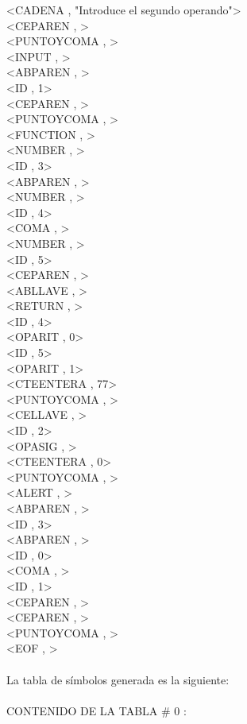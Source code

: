 \documentclass{article}
\begin{document}
\begin{flushleft}
<CADENA , "Introduce el segundo operando">\\
<CEPAREN , >\\
<PUNTOYCOMA , >\\
<INPUT , >\\
<ABPAREN , >\\
<ID , 1>\\
<CEPAREN , >\\
<PUNTOYCOMA , >\\
<FUNCTION , >\\
<NUMBER , >\\
<ID , 3>\\
<ABPAREN , >\\
<NUMBER , >\\
<ID , 4>\\
<COMA , >\\
<NUMBER , >\\
<ID , 5>\\
<CEPAREN , >\\
<ABLLAVE , >\\
<RETURN , >\\
<ID , 4>\\
<OPARIT , 0>\\
<ID , 5>\\
<OPARIT , 1>\\
<CTEENTERA , 77>\\
<PUNTOYCOMA , >\\
<CELLAVE , >\\
<ID , 2>\\
<OPASIG , >\\
<CTEENTERA , 0>\\
<PUNTOYCOMA , >\\
<ALERT , >\\
<ABPAREN , >\\
<ID , 3>\\
<ABPAREN , >\\
<ID , 0>\\
<COMA , >\\
<ID , 1>\\
<CEPAREN , >\\
<CEPAREN , >\\
<PUNTOYCOMA , >\\
<EOF , >\\
\quad\\
\clearpage
La tabla de símbolos generada es la siguiente:\\
\quad\\
CONTENIDO DE LA TABLA \# 0 :\\


\end{flushleft}
\end{document}
